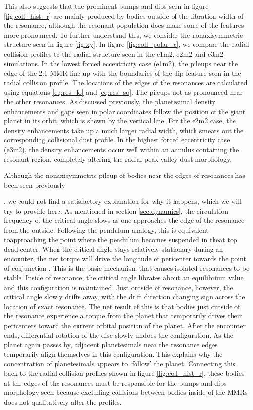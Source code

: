This also suggests that the prominent bumps and dips seen in figure \ref{fig:coll_hist_r} are mainly produced by bodies outside 
of the libration width of the resonance, although the resonant population does make some of the features more pronounced. To 
further understand this, we consider the nonaxisymmetric structure seen in figure \ref{fig:xy}. In figure \ref{fig:coll_polar_e}, we 
compare the radial collision profiles to the radial structure seen in the e1m2, e2m2 and e3m2 simulations. In the lowest forced 
eccentricity case (e1m2), the pileups near the edge of the 2:1 MMR line up with the boundaries of the dip feature seen in the 
radial collision profile. The locations of the edges of the resonances are calculated using equations \ref{eq:res_fo} and 
\ref{eq:res_so}. The pileups not as pronounced near the other resonances. As discussed previously, the planetesimal density 
enhancements and gaps seen in polar coordinates follow the position of the giant planet in its orbit, which is shown by the 
vertical line. For the e2m2 case, the density enhancements take up a much larger radial width, which smears out the 
corresponding collisional dust profile. In the highest forced eccentricity case (e3m2), the density enhancements occur well within 
an annulus containing the resonant region, completely altering the radial peak-valley dust morphology.

Although the nonaxisymmetric pileup of bodies near the edges of resonances has been seen previously 

\cite{richardson00, tabeshian16}, we could not find a satisfactory explanation for why it happens, which we will try to provide 
here. As mentioned in section \ref{sec:dynamics}, the circulation frequency of the critical angle slows as one approaches the 
edge of the resonance from the outside. Following the pendulum analogy, this is equivalent toapproaching the point where the 
pendulum becomes suspended in theat top dead center. When the critical angle stays relatively stationary during an encounter, 
the net torque will drive the longitude of pericenter towards the point of conjunction \cite{peale76}.  This is the basic mechanism 
that causes isolated resonances to be stable. Inside of resonance, the critical angle librates about an equilibrium value and this 
configuration is maintained. Just outside of resonance, however, the critical angle slowly drifts away, with the drift direction 
changing sign across the location of exact resonance. The net result of this is that bodies just outside of the resonance 
experience a torque from the planet that temporarily drives their pericenters toward the current orbital position of the planet. After 
the encounter ends, differential rotation of the disc slowly undoes the configuration. As the planet again passes by, adjacent 
planetesimals near the resonance edges temporarily align themselves in this configuration. This explains why the concentration 
of planetesimals appears to `follow' the planet. Connecting this back to the radial collision profiles shown in figure 
\ref{fig:coll_hist_r}, these bodies at the edges of the resonances must be responsible for the bumps and dips morphology seen 
because excluding collisions between bodies inside of the MMRs does not qualitatively alter the profiles.

